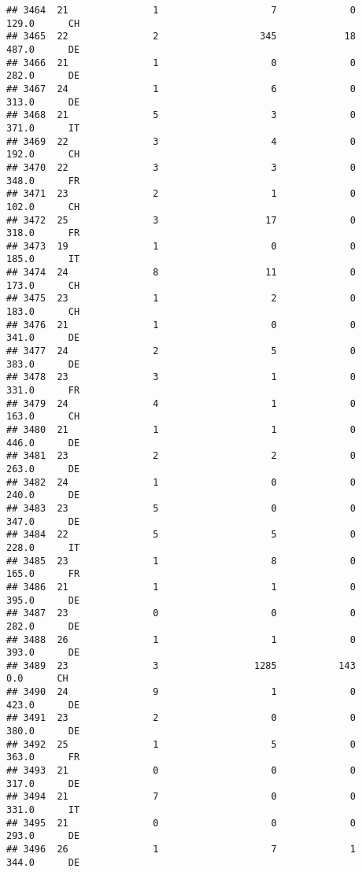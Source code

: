 \documentclass[
]{article}
\begin{document}
\begin{verbatim}
## 3464  21               1                    7             0    129.0      CH
## 3465  22               2                  345            18    487.0      DE
## 3466  21               1                    0             0    282.0      DE
## 3467  24               1                    6             0    313.0      DE
## 3468  21               5                    3             0    371.0      IT
## 3469  22               3                    4             0    192.0      CH
## 3470  22               3                    3             0    348.0      FR
## 3471  23               2                    1             0    102.0      CH
## 3472  25               3                   17             0    318.0      FR
## 3473  19               1                    0             0    185.0      IT
## 3474  24               8                   11             0    173.0      CH
## 3475  23               1                    2             0    183.0      CH
## 3476  21               1                    0             0    341.0      DE
## 3477  24               2                    5             0    383.0      DE
## 3478  23               3                    1             0    331.0      FR
## 3479  24               4                    1             0    163.0      CH
## 3480  21               1                    1             0    446.0      DE
## 3481  23               2                    2             0    263.0      DE
## 3482  24               1                    0             0    240.0      DE
## 3483  23               5                    0             0    347.0      DE
## 3484  22               5                    5             0    228.0      IT
## 3485  23               1                    8             0    165.0      FR
## 3486  21               1                    1             0    395.0      DE
## 3487  23               0                    0             0    282.0      DE
## 3488  26               1                    1             0    393.0      DE
## 3489  23               3                 1285           143      0.0      CH
## 3490  24               9                    1             0    423.0      DE
## 3491  23               2                    0             0    380.0      DE
## 3492  25               1                    5             0    363.0      FR
## 3493  21               0                    0             0    317.0      DE
## 3494  21               7                    0             0    331.0      IT
## 3495  21               0                    0             0    293.0      DE
## 3496  26               1                    7             1    344.0      DE

\end{verbatim}
\end{document}
